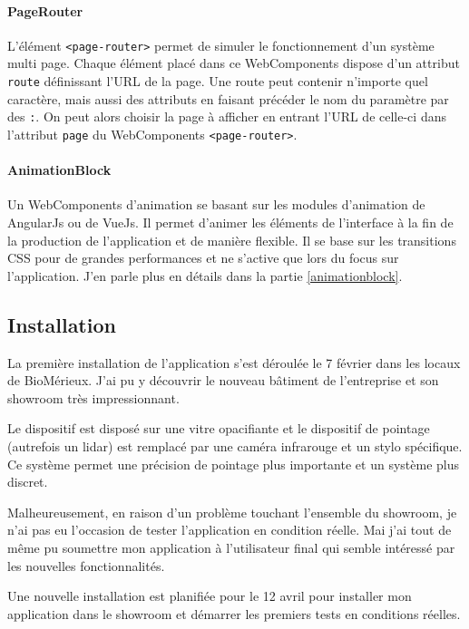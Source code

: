 \paragraph{PageRouter} L'élément \texttt{<page-router>} permet de simuler le fonctionnement d'un système multi page.
Chaque élément placé dans ce WebComponents dispose d'un attribut \texttt{route} définissant l'URL de la page.
Une route peut contenir n'importe quel caractère, mais aussi des attributs en faisant précéder le nom du paramètre par des \texttt{:}.
On peut alors choisir la page à afficher en entrant l'URL de celle-ci dans l'attribut \texttt{page} du WebComponents \texttt{<page-router>}.

\paragraph{AnimationBlock} Un WebComponents d'animation se basant sur les modules d'animation de AngularJs ou de VueJs.
Il permet d'animer les éléments de l'interface à la fin de la production de l'application et de manière flexible.
Il se base sur les transitions CSS pour de grandes performances et ne s'active que lors du focus sur l'application.
J'en parle plus en détails dans la partie \ref{animationblock}.

\subsection{Installation}
\label{bmxinstallation}

La première installation de l'application s'est déroulée le 7 février dans les locaux de BioMérieux.
J'ai pu y découvrir le nouveau bâtiment de l'entreprise et son showroom très impressionnant.

Le dispositif est disposé sur une vitre opacifiante et le dispositif de pointage (autrefois un lidar) est remplacé par une caméra infrarouge et un stylo spécifique.
Ce système permet une précision de pointage plus importante et un système plus discret.

Malheureusement, en raison d'un problème touchant l'ensemble du showroom, je n'ai pas eu l'occasion de tester l'application en condition réelle.
Mai j'ai tout de même pu soumettre mon application à l'utilisateur final qui semble intéressé par les nouvelles fonctionnalités.

Une nouvelle installation est planifiée pour le 12 avril pour installer mon application dans le showroom et démarrer les premiers tests en conditions réelles.

